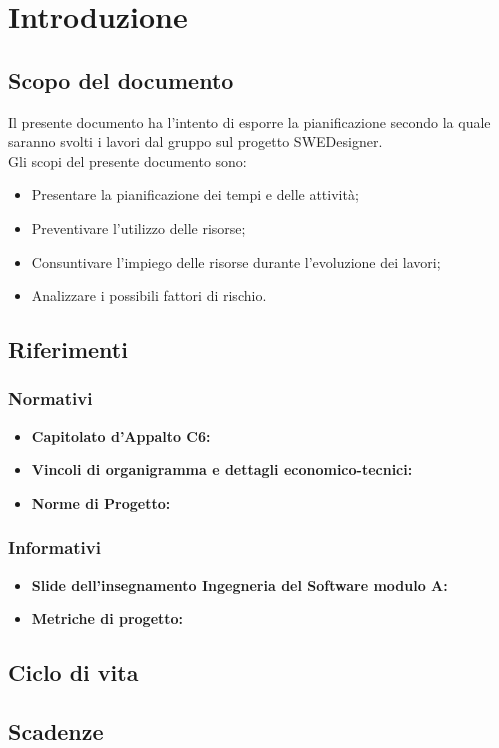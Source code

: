 \section{Introduzione}
\subsection{Scopo del documento}
Il presente documento ha l'intento di esporre la pianificazione secondo la quale saranno svolti i lavori dal gruppo sul 		progetto SWEDesigner. \\
Gli scopi del presente documento sono:
\begin{itemize}
	\item Presentare la pianificazione dei tempi e delle attività; \\
	\item Preventivare l'utilizzo delle risorse; \\
	\item Consuntivare l'impiego delle risorse durante l'evoluzione dei lavori; \\
	\item Analizzare i possibili fattori di rischio. \\
\end{itemize}
\subsection{Riferimenti}
\subsubsection{Normativi}
\begin{itemize}
	\item \textbf{Capitolato d'Appalto C6:} \\
	\item \textbf{Vincoli di organigramma e dettagli economico-tecnici:} \\
	\item \textbf{Norme di Progetto:} \\
\end{itemize}
\subsubsection{Informativi}
\begin{itemize}
	\item \textbf{Slide dell'insegnamento Ingegneria del Software modulo A:} \\
	\item \textbf{Metriche di progetto:} \\
\end{itemize}
\subsection{Ciclo di vita}
\subsection{Scadenze}